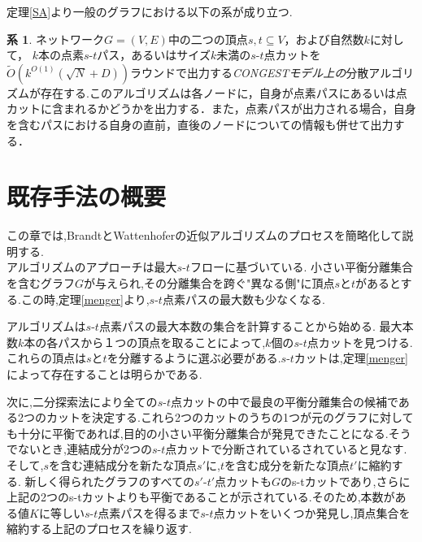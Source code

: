 \documentclass{thesis}
\theoremstyle{definition}
\newtheorem{corollary}{系}
\begin{document}
定理\ref{SA}より一般のグラフにおける以下の系が成り立つ.

\begin{corollary}
    ネットワーク$G=(V,E)$中の二つの頂点$s,t\subseteq V$，および自然数$k$に対して，
    $k$本の点素$s$-$t$パス，あるいはサイズ$k$未満の$s$-$t$点カットを
    $\tilde{O}(k^{O(1)}(\sqrt{N} + D))$ラウンドで出力する\textit{CONGESTモデル上の}分散アルゴリズムが存在する.このアルゴリズムは各ノードに，自身が点素パスにあるいは点カットに含まれるかどうかを出力する．また，点素パスが出力される場合，自身を含むパスにおける自身の直前，直後のノードについての情報も併せて出力する．
    \end{corollary}

\chapter{既存手法の概要}

この章では,BrandtとWattenhoferの近似アルゴリズム\cite{brandt2017approximating}のプロセスを簡略化して説明する.\\

アルゴリズムのアプローチは最大$s$-$t$フローに基づいている.
小さい平衡分離集合を含むグラフ$G$が与えられ,その分離集合を跨ぐ"異なる側"に頂点$s$と$t$があるとする.この時,定理\ref{menger}より,$s$-$t$点素パスの最大数も少なくなる.\par
アルゴリズムは$s$-$t$点素パスの最大本数の集合を計算することから始める.
最大本数$k$本の各パスから１つの頂点を取ることによって,$k$個の$s$-$t$点カットを見つける.これらの頂点は$s$と$t$を分離するように選ぶ必要がある.$s$-$t$カットは,定理\ref{menger}によって存在することは明らかである.\par

次に,二分探索法により全ての$s$-$t$点カットの中で最良の平衡分離集合の候補である2つのカットを決定する.これら2つのカットのうちの1つが元のグラフに対しても十分に平衡であれば,目的の小さい平衡分離集合が発見できたことになる.そうでないとき,連結成分が2つの$s$-$t$点カットで分断されているされていると見なす.そして,$s$を含む連結成分を新たな頂点$s'$に,$t$を含む成分を新たな頂点$t'$に縮約する.
新しく得られたグラフのすべての$s'$-$t'$点カットも$G$のs-tカットであり,さらに上記の2つのs-tカットよりも平衡であることが示されている.そのため,本数がある値$K$に等しい$s$-$t$点素パスを得るまで$s$-$t$点カットをいくつか発見し,頂点集合を縮約する上記のプロセスを繰り返す.\par
\end{document}

